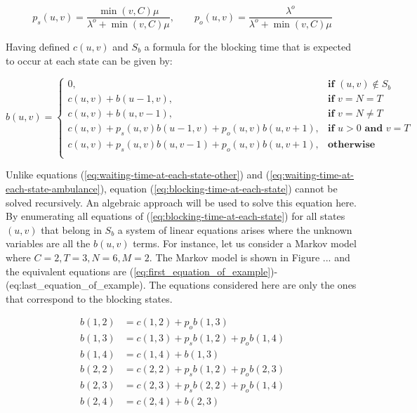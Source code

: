 \begin{equation*}
    p_s(u,v) = \frac{\min(v,C)\mu}{\lambda^o + \min(v,C)\mu}, \qquad
    p_o(u,v) = \frac{\lambda^o}{\lambda^o + \min(v,C)\mu}
\end{equation*}


Having defined \(c(u,v)\) and \(S_b\) a formula for the blocking time that is
expected to occur at each state can be given by:

\begin{equation}\label{eq:blocking-time-at-each-state}
    b(u,v) = 
    \begin{cases} 
        0, & \textbf{if } (u,v) \notin S_b \\
        c(u,v) + b(u - 1, v), & \textbf{if } v = N = T\\
        c(u,v) + b(u, v-1), & \textbf{if } v = N \neq T \\
        c(u,v) + p_s(u,v) b(u-1, v) + p_o(u,v) b(u, v+1), & \textbf{if } u > 0 \textbf{ and } v = T \\
        c(u,v) + p_s(u,v) b(u, v-1) + p_o(u,v) b(u, v+1), & \textbf{otherwise} \\
    \end{cases}
\end{equation}

Unlike equations (\ref{eq:waiting-time-at-each-state-other}) and 
(\ref{eq:waiting-time-at-each-state-ambulance}), equation 
(\ref{eq:blocking-time-at-each-state}) cannot be solved recursively. 
An algebraic approach will be used to solve this equation here. 
By enumerating all equations of (\ref{eq:blocking-time-at-each-state}) for all states \((u,v)\) that belong in \(S_b\) 
a system of linear equations arises where the unknown variables are all the \(b(u,v)\)
terms.
For instance, let us consider a Markov model where \(C=2, T=3, N=6, M=2\). 
The Markov model is shown in Figure ... and the equivalent equations are (\ref{eq:first_equation_of_example})-(eq:last_equation_of_example).
The equations considered here are only the ones that correspond to the blocking 
states.

\begin{multicols*}{2}
    \scalebox{0.68}{}
    \columnbreak
    \vspace*{0cm} 
    \begin{align}
        b(1,2) &= c(1,2) + p_o b(1,3) \label{eq:first_equation_of_example}
\\
        b(1,3) &= c(1,3) + p_s b(1,2) + p_o b(1,4) \\
        b(1,4) &= c(1,4) + b(1,3) \\
        b(2,2) &= c(2,2) + p_s b(1,2) + p_o b(2,3) \\
        b(2,3) &= c(2,3) + p_s b(2,2) + p_o b(1,4) \\
        b(2,4) &= c(2,4) + b(2,3)\label{eq:last_equation_of_example}
    \end{align}
\end{multicols*}

